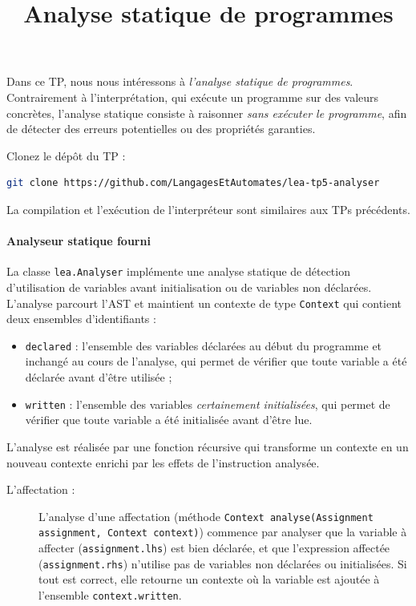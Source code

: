 \documentclass{td}
\title{Analyse statique de programmes}
\begin{document}
\maketitle

Dans ce TP, nous nous intéressons à \emph{l'analyse statique de programmes}.
Contrairement à l'interprétation, qui exécute un programme sur des valeurs concrètes,
l'analyse statique consiste à raisonner \emph{sans exécuter le programme},
afin de détecter des erreurs potentielles ou des propriétés garanties.

\begin{exercice}

  \begin{question}
  \item Clonez le dépôt du TP :
    \begin{lstlisting}[gobble=6, language=bash]
      git clone https://github.com/LangagesEtAutomates/lea-tp5-analyser
    \end{lstlisting}

    La compilation et l'exécution de l'interpréteur sont similaires aux TPs précédents.
  \end{question}

  \paragraph{Analyseur statique fourni}
  
  La classe \lstinline{lea.Analyser} implémente une analyse statique de détection d'utilisation de variables avant initialisation ou de variables non déclarées.
  L'analyse parcourt l'AST et maintient un contexte de type \lstinline{Context} qui contient deux ensembles d'identifiants :
  \begin{itemize}
  \item \lstinline{declared} :
    l'ensemble des variables déclarées au début du programme et inchangé au cours de l'analyse,
    qui permet de vérifier que toute variable a été déclarée avant d'être utilisée ;
  \item \lstinline{written} :
    l'ensemble des variables \emph{certainement initialisées},
    qui permet de vérifier que toute variable a été initialisée avant d'être lue.
  \end{itemize}
  
  L'analyse est réalisée par une fonction récursive qui transforme un contexte en un
  nouveau contexte enrichi par les effets de l'instruction analysée. 
  \begin{description}
  \item[L'affectation :]
    L'analyse d'une affectation (méthode \lstinline{Context analyse(Assignment assignment, Context context)})
    commence par analyser que la variable à affecter (\lstinline{assignment.lhs}) est bien déclarée,
    et que l'expression affectée (\lstinline{assignment.rhs}) n'utilise pas de variables non déclarées ou initialisées.
    Si tout est correct, elle retourne un contexte où la variable est ajoutée à l'ensemble \lstinline{context.written}.
    

\end{description}
\end{exercice}
\end{document}
